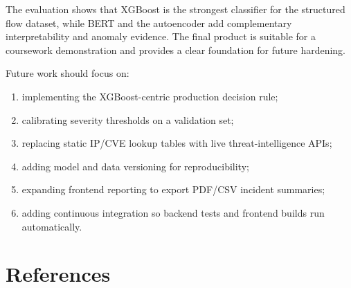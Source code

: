 \documentclass[12pt,a4paper]{article}
\begin{document}
The evaluation shows that XGBoost is the strongest classifier for the structured flow dataset, while BERT and the autoencoder add complementary interpretability and anomaly evidence. The final product is suitable for a coursework demonstration and provides a clear foundation for future hardening.

Future work should focus on:

\begin{enumerate}[leftmargin=1.2cm]
    \item implementing the XGBoost-centric production decision rule;
    \item calibrating severity thresholds on a validation set;
    \item replacing static IP/CVE lookup tables with live threat-intelligence APIs;
    \item adding model and data versioning for reproducibility;
    \item expanding frontend reporting to export PDF/CSV incident summaries;
    \item adding continuous integration so backend tests and frontend builds run automatically.
\end{enumerate}

\section{References}
\end{document}
